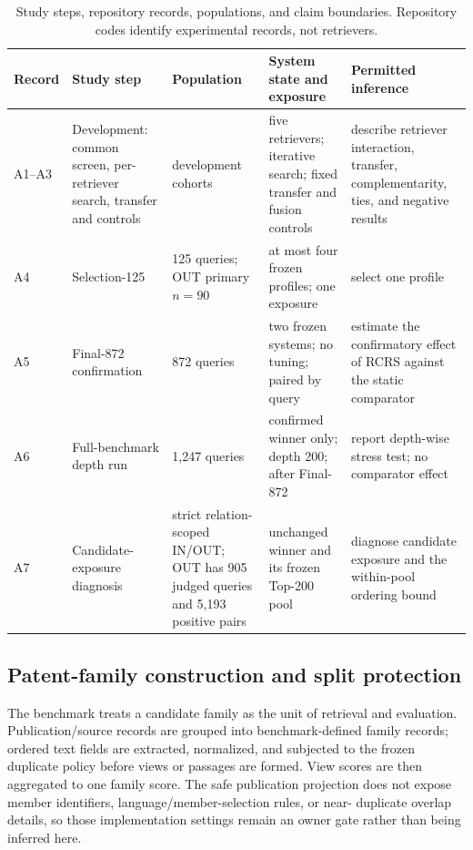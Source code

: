 \documentclass[final,5p,times,twocolumn]{elsarticle}
\newcommand{\RCRS}{RCRS}
\newenvironment{widejournal}{\begin{table}[!t]}{\end{table}}
\newcommand{\journalTableFont}{\footnotesize}
\newenvironment{widejournal}{\begin{table}[!htbp]}{\end{table}}
\newcommand{\journalTableFont}{\footnotesize}
\begin{document}
\begin{widejournal}
\caption{Study steps, repository records, populations, and claim boundaries.
Repository codes identify experimental records, not retrievers.}
\label{tab:protocol}
\centering
\journalTableFont
\renewcommand{\arraystretch}{0.98}
\begin{tabularx}{\textwidth}{@{}P{1.2cm}P{2.3cm}P{2.6cm}P{3.4cm}Y@{}}
\toprule
Record & Study step & Population & System state and exposure & Permitted inference \\
\midrule
\mbox{A1--A3} & Development: common screen, per-retriever search, transfer and controls
& development cohorts & five retrievers; iterative search; fixed transfer and
fusion controls & describe retriever interaction, transfer, complementarity,
ties, and negative results \\
A4 & Selection-125 & 125 queries; OUT primary \(n=90\) & at most four frozen
profiles; one exposure & select one profile \\
A5 & Final-872 confirmation & 872 queries & two frozen systems; no tuning;
paired by query & estimate the confirmatory effect of \RCRS{} against the
static comparator \\
A6 & Full-benchmark depth run & 1,247 queries & confirmed winner only; depth
200; after Final-872 & report depth-wise stress test; no comparator effect \\
A7 & Candidate-exposure diagnosis & strict relation-scoped IN/OUT; OUT has 905
judged queries and 5,193 positive pairs & unchanged winner and its frozen
Top-200 pool & diagnose candidate exposure and the within-pool ordering bound \\
\bottomrule
\end{tabularx}
\end{widejournal}

\subsection{Patent-family construction and split protection}

The benchmark treats a candidate family as the unit of retrieval and
evaluation. Publication/source records are grouped into benchmark-defined
family records; ordered text fields are extracted, normalized, and subjected
to the frozen duplicate policy before views or passages are formed. View scores
are then aggregated to one family score. The safe publication projection does
not expose member identifiers, language/member-selection rules, or near-
duplicate overlap details, so those implementation settings remain an owner
gate rather than being inferred here.
\end{document}
